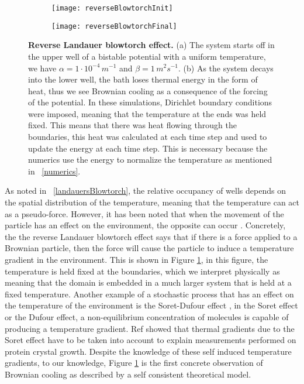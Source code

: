 \begin{figure}
	\begin{subfigure}{0.49\textwidth}
		\texttt{[image: reverseBlowtorchInit]}
	\end{subfigure}
	\begin{subfigure}{0.49\textwidth}
		\texttt{[image: reverseBlowtorchFinal]}
	\end{subfigure}
	\caption{\textbf{Reverse Landauer blowtorch effect.} (a) The system starts off in the upper well of a bistable potential with a uniform temperature, we have $\alpha = 1 \cdot 10^{-4} \, m^{-1}$ and $\beta = 1  \, m^2 s^{-1}$. (b) As the system decays into the lower well, the bath loses thermal energy in the form of heat, thus we see Brownian cooling as a consequence of the forcing of the potential. In these simulations, Dirichlet boundary conditions were imposed, meaning that the temperature at the ends was held fixed. This means that there was heat flowing through the boundaries, this heat was calculated at each time step and used to update the energy at each time step. This is necessary because the numerics use the energy to normalize the temperature as mentioned in ~\autoref{numerics}. \label{fig:reverseBlowtorch}}
\end{figure}
As noted in ~\autoref{landauersBlowtorch}, the relative occupancy of wells depends on the spatial distribution of the temperature, meaning that the temperature can act as a pseudo-force. However, it has been noted that when the movement of the particle has an effect on the environment, the opposite can occur \cite{DasDasBarikEtAl2015}. Concretely, the the reverse Landauer blowtorch effect says that if there is a force applied to a Brownian particle, then the force will cause the particle to induce a temperature gradient in the environment. This is shown in Figure \ref{fig:reverseBlowtorch}, in this figure, the temperature is held fixed at the boundaries, which we interpret physically as meaning that the domain is embedded in a much larger system that is held at a fixed temperature. Another example of a stochastic process that has an effect on the temperature of the environment is the Soret-Dufour effect \cite{Onsager1931,HortLinzLuecke1992,PiazzaGuarino2002}, in the Soret effect or the Dufour effect, a non-equilibrium concentration of molecules is capable of producing a temperature gradient. Ref \cite{Santamaria-HolekGadomskiRubi2011} showed that thermal gradients due to the Soret effect have to be taken into account to explain measurements performed on protein crystal growth. Despite the knowledge of these self induced temperature gradients, to our knowledge, Figure \ref{fig:reverseBlowtorch} is the first concrete observation of Brownian cooling as described by a self consistent theoretical model.


